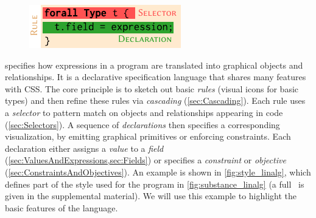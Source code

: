 \setlength{\columnsep}{1em}
\setlength{\intextsep}{1em}
\begin{figure}
   \includegraphics[width=\linewidth]{assets/penrose/StyleNomenclature.pdf}
\end{figure}
\Style{} specifies how expressions in a \Substance{} program are translated into graphical objects and relationships.  It is a declarative specification language that shares many features with CSS.  The core principle is to sketch out basic \emph{rules} (\eg visual icons for basic types) and then refine these rules via \emph{cascading} (\cref{sec:Cascading}).  Each rule uses a \emph{selector} to pattern match on objects and relationships appearing in \Substance{} code (\cref{sec:Selectors}).  A sequence of \emph{declarations} then specifies a corresponding visualization, \eg by emitting graphical primitives or enforcing constraints.  Each declaration either assigns a \emph{value} to a \emph{field} (\cref{sec:ValuesAndExpressions,sec:Fields}) or specifies a \emph{constraint} or \emph{objective} (\cref{sec:ConstraintsAndObjectives}).  An example is shown in \cref{fig:style_linalg}, which defines part of the style used for the \Substance{} program in \cref{fig:substance_linalg} (a full \Style\ is given in the supplemental material).  We will use this example to highlight the basic features of the language.  


